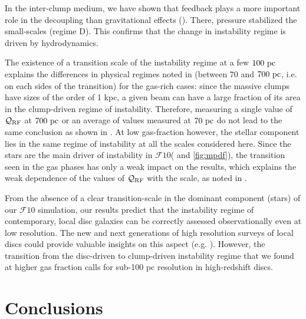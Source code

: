 \documentclass[useAMS,usenatbib]{mnras}
\newcommand{\qrf}{\ensuremath{\mathcal{Q}_{\rm RF}}\xspace}
\newcommand{\gs}{\ensuremath{\mathcal{F}10}\xspace}
\begin{document}
In the inter-clump medium, we have shown that feedback plays a more important role in the decoupling than gravitational effects (). There, pressure stabilized the small-scales (regime D). This confirms that the change in instability regime is driven by hydrodynamics.

The existence of a transition scale of the instability regime at a few $100 \mathrm{~pc}$ explains the differences in physical regimes noted in  (between $70$ and $700 \mathrm{~pc}$, i.e. on each sides of the transition) for the gas-rich cases: since the massive clumps have sizes of the order of 1 kpc, a given beam can have a large fraction of its area in the clump-driven regime of instability. Therefore, measuring a single value of \qrf at $700 \mathrm{~pc}$ or an average of values measured at $70 \mathrm{~pc}$ do not lead to the same conclusion as shown in . At low gas-fraction however, the stellar component lies in the same regime of instability at all the scales considered here. Since the stars are the main driver of instability in \gs ( and \ref{fig:mpdf}), the transition seen in the gas phases has only a weak impact on the results, which explains the weak dependence of the values of \qrf with the scale, as noted in .

From the absence of a clear transition-scale in the dominant component (stars) of our \gs simulation, our results predict that the instability regime of contemporary, local disc galaxies can be correctly assessed observationally even at low resolution. The new and next generations of high resolution surveys of local discs could provide valuable insights on this aspect (e.g. \citealt{Leroy2021}). However, the transition from the disc-driven to clump-driven instability regime that we found at higher gas fraction calls for sub-100 pc resolution in high-redshift discs.

\section{Conclusions}
\end{document}
